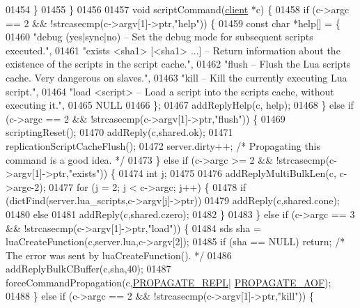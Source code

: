 \begin{DoxyCode}
{{{{{{{{{{{{01454     \}
01455 \}
01456 
01457 \textcolor{keywordtype}{void} scriptCommand(\hyperlink{structclient}{client} *c) \{
01458     \textcolor{keywordflow}{if} (c->argc == 2 && !strcasecmp(c->argv[1]->ptr,\textcolor{stringliteral}{"help"})) \{
01459         \textcolor{keyword}{const} \textcolor{keywordtype}{char} *help[] = \{
01460 \textcolor{stringliteral}{"debug (yes|sync|no) -- Set the debug mode for subsequent scripts executed."},
01461 \textcolor{stringliteral}{"exists <sha1> [<sha1> ...] -- Return information about the existence of the scripts in the script
       cache."},
01462 \textcolor{stringliteral}{"flush -- Flush the Lua scripts cache. Very dangerous on slaves."},
01463 \textcolor{stringliteral}{"kill -- Kill the currently executing Lua script."},
01464 \textcolor{stringliteral}{"load <script> -- Load a script into the scripts cache, without executing it."},
01465 NULL
01466         \};
01467         addReplyHelp(c, help);
01468     \} \textcolor{keywordflow}{else} \textcolor{keywordflow}{if} (c->argc == 2 && !strcasecmp(c->argv[1]->ptr,\textcolor{stringliteral}{"flush"})) \{
01469         scriptingReset();
01470         addReply(c,shared.ok);
01471         replicationScriptCacheFlush();
01472         server.dirty++; \textcolor{comment}{/* Propagating this command is a good idea. */}
01473     \} \textcolor{keywordflow}{else} \textcolor{keywordflow}{if} (c->argc >= 2 && !strcasecmp(c->argv[1]->ptr,\textcolor{stringliteral}{"exists"})) \{
01474         \textcolor{keywordtype}{int} j;
01475 
01476         addReplyMultiBulkLen(c, c->argc-2);
01477         \textcolor{keywordflow}{for} (j = 2; j < c->argc; j++) \{
01478             \textcolor{keywordflow}{if} (dictFind(server.lua\_scripts,c->argv[j]->ptr))
01479                 addReply(c,shared.cone);
01480             \textcolor{keywordflow}{else}
01481                 addReply(c,shared.czero);
01482         \}
01483     \} \textcolor{keywordflow}{else} \textcolor{keywordflow}{if} (c->argc == 3 && !strcasecmp(c->argv[1]->ptr,\textcolor{stringliteral}{"load"})) \{
01484         sds sha = luaCreateFunction(c,server.lua,c->argv[2]);
01485         \textcolor{keywordflow}{if} (sha == NULL) \textcolor{keywordflow}{return}; \textcolor{comment}{/* The error was sent by luaCreateFunction(). */}
01486         addReplyBulkCBuffer(c,sha,40);
01487         forceCommandPropagation(c,\hyperlink{server_8h_a59c6e025b4ed85642a0472fc3e73e298}{PROPAGATE\_REPL}|
      \hyperlink{server_8h_a542fb79924ca427c866fd63632f60777}{PROPAGATE\_AOF});
01488     \} \textcolor{keywordflow}{else} \textcolor{keywordflow}{if} (c->argc == 2 && !strcasecmp(c->argv[1]->ptr,\textcolor{stringliteral}{"kill"})) \{
}}}}}}}}}}}}
\end{DoxyCode}
